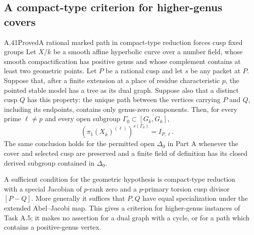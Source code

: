 \subsection{A compact-type criterion for higher-genus covers}

\begin{statement}{A.41}{Proved}{A rational marked path in compact-type reduction forces cusp fixed groups}
Let \(X/k\) be a smooth affine hyperbolic curve over a number
field, whose smooth compactification has positive genus and
whose complement contains at least two geometric points.
Let \(P\) be a rational cusp and let \(s\) be any packet
at \(P\). Suppose that, after a finite extension at a place
of residue characteristic \(p\), the pointed stable model
has a tree as its dual graph. Suppose also that a distinct
cusp \(Q\) has this property: the unique path between the
vertices carrying \(P\) and \(Q\), including its endpoints,
contains only genus-zero components. Then, for every prime
\(\ell\ne p\) and every open subgroup
\(\Gamma_0\subset\overline{[G_k,G_k]}\),
\[
 \left(\pi_1(X_{\bar k})^{(\ell)}\right)^{s(\Gamma_0)}
                         =I_{P,\ell}.                 \tag{A.41.1}
\]
The same conclusion holds for the permitted open
\(\Delta_0\) in Part A whenever the cover and selected
cusp are preserved and a finite field of definition has
its closed derived subgroup contained in \(\Delta_0\).

A sufficient condition for the geometric hypothesis is
compact-type reduction with a special Jacobian of
\(p\)-rank zero and a \(p\)-primary torsion cusp divisor
\([P-Q]\). More generally it suffices that \(P,Q\) have
equal specialization under the extended Abel--Jacobi map.
This gives a criterion for higher-genus instances of
Task A.5; it makes no assertion for a dual graph with a
cycle, or for a path which contains a positive-genus vertex.
\end{statement}

